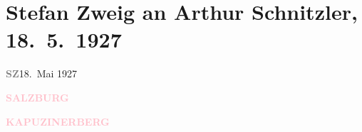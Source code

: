 

\renewcommand{\erwaehntePersonen}{Personen: Stefan Zweig}
\renewcommand{\erwaehnteInstitutionen}{Institutionen: Burgtheater, S. Fischer Verlag}
\renewcommand{\erwaehnteOrte}{Orte: Paschinger Schlössl, Salzburg, XIII., Hietzing}
\renewcommand{\erwaehnteWerke}{Werke: Berliner Illustrirte Zeitung, Börsenblatt für den Deutschen Buchhandel, Der Gang zum Weiher. Dramatische Dichtung, Fräulein Else, Spiel im Morgengrauen. Novelle}
\section[Stefan Zweig an Arthur Schnitzler, 18. 5. 1927]{Stefan Zweig an Arthur Schnitzler, 18. 5. 1927}
\nopagebreak{}
\rehead{ }\normalsize\beginnumbering{}
\toendnotes[C]{\smallbreak\pagebreak[2]}
\toendnotes[C]{\smallbreak}
\pstart
           {\pb}\textcolor{gray}{\textbf{SZ}}\hfill 18. Mai 1927\pend
           
\pstart
           \raggedleft{}\textcolor{gray}{\textbf{\textcolor{pink}{SALZBURG}{}\ledrightnote{\textcolor{pink}{Salzburg}}}}\pend
           
\pstart
           \raggedleft{}\textcolor{gray}{\textbf{\textcolor{pink}{KAPUZINERBERG}{}\ledrightnote{\textcolor{pink}{Paschinger Schlössl}}}}\pend
           

